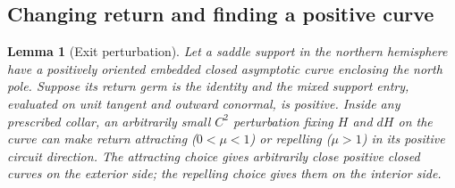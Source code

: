 \documentclass[11pt]{amsart}
\newtheorem{lemma}[theorem]{Lemma}
\theoremstyle{definition}
\theoremstyle{remark}
\numberwithin{equation}{section}
\begin{document}
\subsection{Changing return and finding a positive curve}
\begin{lemma}[Exit perturbation]\label{lem:exit}
Let a saddle support in the northern hemisphere have a positively oriented
embedded closed asymptotic curve enclosing the north pole. Suppose its
return germ is the identity and the mixed support entry, evaluated on
unit tangent and outward conormal, is positive. Inside any prescribed
collar, an arbitrarily small $C^2$ perturbation fixing $H$ and $dH$ on
the curve can make return attracting ($0<\mu<1$) or repelling
($\mu>1$) in its positive circuit direction. The attracting choice
gives arbitrarily close positive closed curves on the exterior side;
the repelling choice gives them on the interior side.
\end{lemma}
\end{document}
